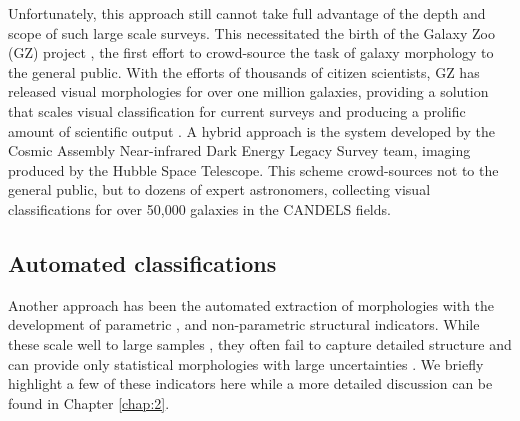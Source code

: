 Unfortunately, this approach still cannot take full advantage of the depth and scope of such large scale surveys. This necessitated the birth of the Galaxy Zoo (GZ) project \citep{Lintott2008, Lintott2011, Willett2013, Willett2017, Simmons2017}, the first effort to crowd-source the task of galaxy morphology to the general public. With the efforts of thousands of citizen scientists, GZ has released visual morphologies for over one million galaxies, providing a solution that scales visual classification for current surveys and producing a prolific amount of scientific output \citep[e.g.,][]{Land2008, Bamford2009, Darg2010, Schawinski2014, Galloway2015, Smethurst2016}.
A hybrid approach is the system developed by the Cosmic Assembly Near-infrared Dark Energy Legacy Survey \citep[CANDELS;][]{Grogin2011, Koekemoer2011} team, imaging produced by the Hubble Space Telescope. This scheme \citep{Kartaltepe2015} crowd-sources not to the general public, but to dozens of expert astronomers, collecting visual classifications for over 50,000 galaxies in the CANDELS fields. 


\subsection{Automated classifications}
Another approach has been the automated extraction of morphologies with the development of parametric \citep{Sersic1968, Odewahn2002, Peng2002}, and non-parametric 
\citep{Abraham1994, 
	   Conselice2003, 
	   Abraham2003, 
	   Lotz2004,  
	   Freeman2013} 
structural indicators. While these scale well to large samples 
\citep[e.g.,][]{Simard2011, 
			Griffith2012, 
			Casteels2014, 
			Holwerda2014, 
			Meert2016}, 
they often fail to capture detailed structure and can provide only statistical morphologies with large uncertainties \cite[e.g.,][]{Abraham1996, Bershady2000}. We briefly highlight a few of these indicators here while a more detailed discussion can be found in Chapter \ref{chap:2}. 

